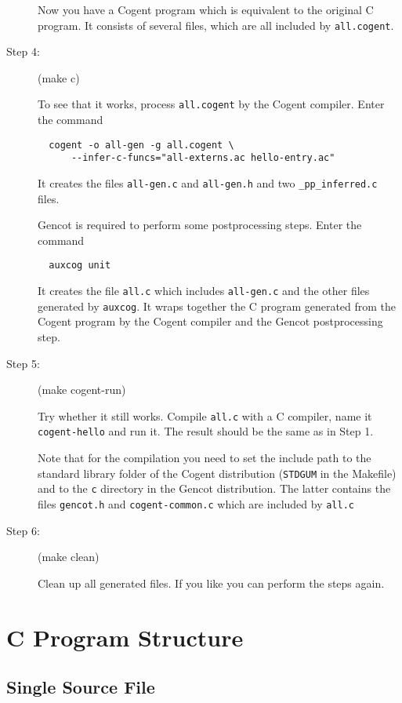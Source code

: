 \documentclass[a4paper]{report}
\newcommand{\code}[1]{\textnormal{\texttt{#1}}}
\begin{document}
\begin{description}
Now you have a Cogent program which is equivalent to the original C program. It consists of several files,
which are all included by \code{all.cogent}.

\item[Step 4:] (make c)

To see that it works, process \code{all.cogent} by the Cogent compiler. Enter the command
\begin{verbatim}
  cogent -o all-gen -g all.cogent \
      --infer-c-funcs="all-externs.ac hello-entry.ac"
\end{verbatim}
It creates the files \code{all-gen.c} and \code{all-gen.h} and two \code{\_pp\_inferred.c} files. 

Gencot is required to perform some postprocessing steps. Enter the command
\begin{verbatim}
  auxcog unit
\end{verbatim}
It creates the file \code{all.c} which includes \code{all-gen.c} and the other files generated by \code{auxcog}. It wraps together 
the C program generated from the Cogent program by the Cogent compiler and the Gencot postprocessing step.

\item[Step 5:] (make cogent-run)

Try whether it still works. Compile \code{all.c} with a C compiler, name it \code{cogent-hello} and run it. The result should be the same
as in Step 1.

Note that for the compilation you need to set the include path to the standard library folder of the Cogent 
distribution (\code{STDGUM} in the Makefile) and to the \code{c} directory in the Gencot distribution. The latter contains the files
\code{gencot.h} and \code{cogent-common.c} which are included by \code{all.c}

\item[Step 6:] (make clean)

Clean up all generated files. If you like you can perform the steps again.
\end{description}

\chapter{C Program Structure}
\label{struct}

\section{Single Source File}
\label{struct-single}
\end{document}
